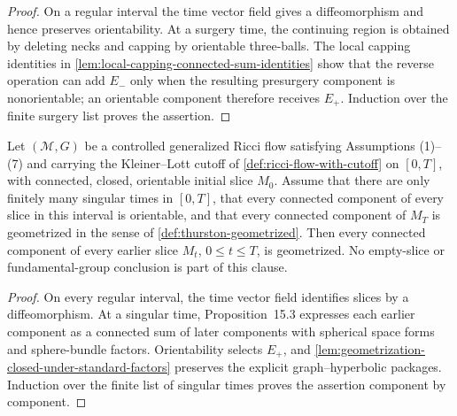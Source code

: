 \begin{proof}
On a regular interval the time vector field gives a diffeomorphism and hence
preserves orientability.  At a surgery time, the continuing region is obtained
by deleting necks and capping by orientable three-balls.  The local capping
identities in \ref{lem:local-capping-connected-sum-identities} show that the
reverse operation can add $E_-$ only when the resulting presurgery component
is nonorientable; an orientable component therefore receives $E_+$.
Induction over the finite surgery list proves the assertion.
\end{proof}

\begin{theorem}
\label{thm:morgan-tian-corollary-15-4}
\notready
Let $({\mathcal M},G)$ be a controlled generalized Ricci flow satisfying
Assumptions (1)--(7) and carrying the Kleiner--Lott cutoff of
\ref{def:ricci-flow-with-cutoff} on $[0,T]$, with connected, closed,
orientable initial slice $M_0$.  Assume that
there are only finitely many singular times in $[0,T]$, that every connected
component of every slice in this interval is orientable, and that every
connected component of $M_T$ is geometrized in the sense of
\ref{def:thurston-geometrized}.  Then every connected component of every
earlier slice $M_t$, $0\le t\le T$, is geometrized.  No empty-slice or
fundamental-group conclusion is part of this clause.
\end{theorem}

\begin{proof}
On every regular interval, the time vector field identifies slices by a
diffeomorphism.  At a singular time, Proposition~15.3 expresses each earlier
component as a connected sum of later components with spherical space forms
and sphere-bundle factors.  Orientability selects $E_+$, and
\ref{lem:geometrization-closed-under-standard-factors} preserves the explicit
graph--hyperbolic packages.  Induction over the finite list of singular times
proves the assertion component by component.
\end{proof}

